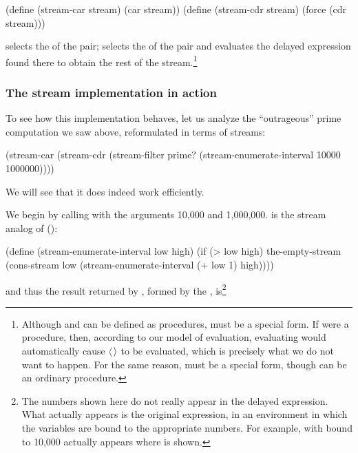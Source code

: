 \begin{codeBlock}
(define (stream-car stream) (car stream))
(define (stream-cdr stream) (force (cdr stream)))
\end{codeBlock}

\noindent
{} selects the  of the pair;  selects
the  of the pair and evaluates the delayed expression found there to
obtain the rest of the stream.\footnote{Although  and
 can be defined as procedures,  must be a
special form.  If  were a procedure, then, according to our
model of evaluation, evaluating  would
automatically cause \( \langle \)\( \kern0.08em\rangle \) to be evaluated, which is precisely what we do
not want to happen.  For the same reason,  must be a special form,
though  can be an ordinary procedure.}

\subsubsection*{The stream implementation in action}

To see how this implementation behaves, let us analyze the ``outrageous'' prime
computation we saw above, reformulated in terms of streams:

\begin{codeBlock}
(stream-car
 (stream-cdr
  (stream-filter prime?
                 (stream-enumerate-interval
                  10000 1000000))))
\end{codeBlock}

\noindent
We will see that it does indeed work efficiently.

We begin by calling  with the arguments 10,000
and 1,000,000.   is the stream analog of
 ():

\begin{codeBlock}
(define (stream-enumerate-interval low high)
  (if (> low high)
      the-empty-stream
      (cons-stream
       low
       (stream-enumerate-interval (+ low 1) high))))
\end{codeBlock}

\noindent
and thus the result returned by , formed by the
, is\footnote{The numbers shown here do not really appear in
the delayed expression.  What actually appears is the original expression, in
an environment in which the variables are bound to the appropriate numbers.
For example,  with  bound to 10,000 actually appears
where  is shown.}

